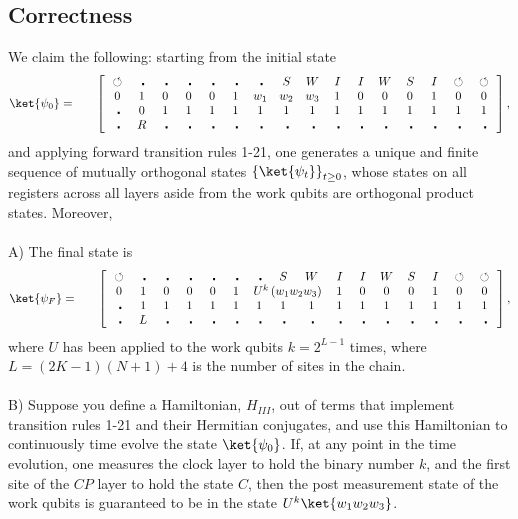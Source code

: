 \documentclass[11pt,letterpaper]{article}
\newcommand{\<}{\langle}
\renewcommand{\>}{\rangle}
\newcommand{\tur}{\,\circlearrowleft\,}   %
\newcommand{\bul}{\:\:\centerdot\:}       %
\newcommand{\iga}{\:I\,}                  %
\newcommand{\wga}{W}						%
\newcommand{\sga}{\:S\,}					%
\begin{document}
\subsection{Correctness}
We claim the following: starting from the initial state
\begin{eqnarray}
	\ket{\psi_{0}} &=& \quad \left[ \begin{array}{cccccccccccccccc}
		\tur & \bul &
		\bul & \bul & \bul & \bul & \bul & \sga & \wga & \iga & \iga & 
		\wga & \sga & \iga & \tur & \tur
		\\		
		0 & 1    & 0    & 0    & 0    & 1    & 
		w_1 & w_2 & w_3
		 &
		1    & 0    & 0    & 0    & 1	& 0	& 0
		\\
		\bul & 0 & 1 & 1 & 1 & 1 & 1 & 1 & 1 & 1 & 1 & 1 & 1 & 1 & 1 & 1
		\\
		\bul & R & \bul & \bul & \bul & \bul & \bul & \bul & \bul & \bul & \bul & \bul & \bul & \bul & \bul & \bul
 	\end{array} \right], \label{psi03}
\end{eqnarray}
and applying forward transition rules 1-21, one generates a unique and finite sequence of mutually orthogonal states $\left\{\ket{\psi_t}\right\}_{t\geq 0}$, whose states on all registers across all layers aside from the work qubits are orthogonal product states. Moreover,
\\
\\
A) The final state is
\begin{eqnarray}
	\ket{\psi_{F}} &=& \quad \left[ \begin{array}{cccccccccccccccc}
		\tur &\bul & \bul & \bul & \bul & \bul & \bul & \sga & \wga & \iga & \iga & 
		\wga & \sga & \iga & \tur & \tur
		\\		
		0 & 1    & 0    & 0    & 0    & 1    & 
		\multicolumn{3}{c}{U^k\left(w_1w_2w_3\right)}
		 &
		1    & 0    & 0    & 0    & 1	& 0	& 0
		\\
		\bul & 1 & 1 & 1 & 1 & 1 & 1 & 1 & 1 & 1 & 1 & 1 & 1 & 1 & 1 & 1
		\\
		\bul & L & \bul & \bul & \bul & \bul & \bul & \bul & \bul & \bul & \bul & \bul & \bul & \bul & \bul & \bul
 	\end{array} \right], \label{psi03}
\end{eqnarray}
where $U$ has been applied to the work qubits $k=2^{L-1}$ times, where $L=(2K-1)(N+1)+4$ is the number of sites in the chain.
\\
\\
B) Suppose you define a Hamiltonian, $H_{III}$, out of terms that implement transition rules 1-21 and their Hermitian conjugates, and use this Hamiltonian to continuously time evolve the state $\ket{\psi_0}$. If, at any point in the time evolution, one measures the clock layer to hold the binary number $k$, and the first site of the $CP$ layer to hold the state $C$, then the post measurement state of the work qubits is guaranteed to be in the state $U^k\ket{w_1 w_2 w_3}$.
\end{document}
